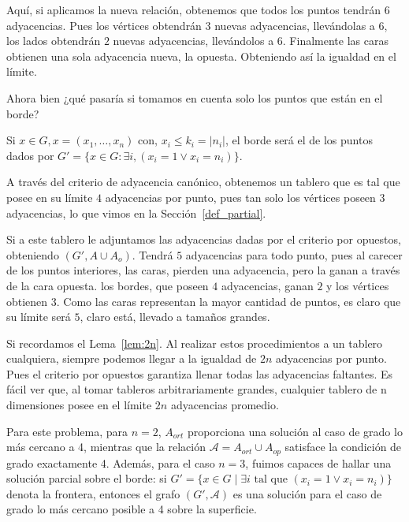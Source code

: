 Aquí, si aplicamos la nueva relación, obtenemos que todos los puntos tendrán $6$ adyacencias. Pues los vértices obtendrán $3$ nuevas adyacencias, llevándolas a $6$, los lados obtendrán $2$ nuevas adyacencias, llevándolos a $6$. Finalmente las caras obtienen una sola adyacencia nueva, la opuesta. Obteniendo así la igualdad en el límite.

Ahora bien ¿qué pasaría si tomamos en cuenta solo los puntos que están en el borde? 

\noindent
Si $x\in G, x=(x_1,\dots,x_n)$ con, $x_i \leq k_i=|n_i|$, el borde será el de los puntos dados por $G'=\{x\in G: \exists i, (x_i= 1 \lor x_i =n_i) \}$.

A través del criterio de adyacencia canónico, obtenemos un tablero que es tal que posee en su límite $4$ adyacencias por punto, pues tan solo los vértices poseen $3$ adyacencias, lo que vimos en la Sección~\ref{def_partial}.

Si a este tablero le adjuntamos las adyacencias dadas por el criterio por opuestos, obteniendo $(G',A\cup A_o)$. Tendrá $5$ adyacencias para todo punto, pues al carecer de los puntos interiores, las caras, pierden una adyacencia, pero la ganan a través de la cara opuesta. los bordes, que poseen $4$ adyacencias, ganan $2$ y los vértices obtienen $3$. Como las caras representan la mayor cantidad de puntos, es claro que su límite será $5$, claro está, llevado a tamaños grandes.

Si recordamos el Lema~\ref{lem:2n}. Al realizar estos procedimientos a un tablero cualquiera, siempre podemos llegar a la igualdad de $2n$ adyacencias por punto. Pues el criterio por opuestos garantiza llenar todas las adyacencias faltantes. Es fácil ver que, al tomar tableros arbitrariamente grandes, cualquier tablero de n dimensiones posee en el límite $2n$ adyacencias promedio. 

Para este problema, para $n=2$, $A_{ort}$ proporciona una solución al caso de grado lo más cercano a 4, mientras que la relación $\mathcal{A} = A_{ort} \cup A_{{op}}$ satisface la condición de grado exactamente 4. Además, para el caso $ n = 3 $, fuimos capaces de hallar una solución parcial sobre el borde: si $G' = \{ x \in G \mid \exists i \text{ tal que } (x_i = 1 \lor x_i = n_i) \}$ denota la frontera, entonces el grafo $(G', \mathcal{A} )$ es una solución para el caso de grado lo más cercano posible a 4 sobre la superficie.

